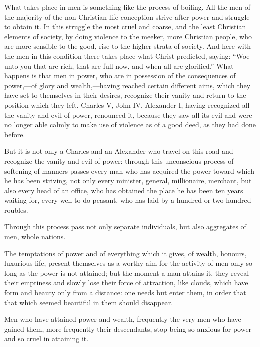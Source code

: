 \documentclass{book}
\begin{document}
What takes place in men is something like the process of boiling. All the men of the majority of the non-Christian life-conception strive after power and struggle to obtain it. In this struggle the most cruel and coarse, and the least Christian elements of society, by doing violence to the meeker, more Christian people, who are more sensible to the good, rise to the higher strata of society. And here with the men in this condition there takes place what Christ predicted, saying: “Woe unto you that are rich, that are full now, and when all are glorified.” What happens is that men in power, who are in possession of the consequences of power,—of glory and wealth,—having reached certain different aims, which they have set to themselves in their desires, recognize their vanity and return to the position which they left. Charles V, John IV, Alexander I, having recognized all the vanity and evil of power, renounced it, because they saw all its evil and were no longer able calmly to make use of violence as of a good deed, as they had done before.

But it is not only a Charles and an Alexander who travel on this road and recognize the vanity and evil of power: through this unconscious process of softening of manners passes every man who has acquired the power toward which he has been striving, not only every minister, general, millionaire, merchant, but also every head of an office, who has obtained the place he has been ten years waiting for, every well-to-do peasant, who has laid by a hundred or two hundred roubles.

Through this process pass not only separate individuals, but also aggregates of men, whole nations.

The temptations of power and of everything which it gives, of wealth, honours, luxurious life, present themselves as a worthy aim for the activity of men only so long as the power is not attained; but the moment a man attains it, they reveal their emptiness and slowly lose their force of attraction, like clouds, which have form and beauty only from a distance: one needs but enter them, in order that that which seemed beautiful in them should disappear.

Men who have attained power and wealth, frequently the very men who have gained them, more frequently their descendants, stop being so anxious for power and so cruel in attaining it.
\end{document}
